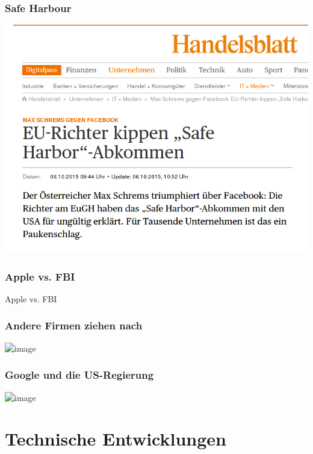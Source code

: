 \documentclass[12pt, xcolor={svgnames,table}]{beamer}
\begin{document}
\begin{frame}
  \frametitle{Safe Harbour}
  \begin{center}
    \includegraphics[height=0.7\textheight]{img/safeharbour.png}
  \end{center}
\end{frame}

\begin{frame}
  \frametitle{Apple vs. FBI}
    \Large Apple vs. FBI
\end{frame}

\begin{frame}
  \frametitle{Andere Firmen ziehen nach}
    \begin{center} 
      \includegraphics<1>[width=0.7\textwidth]{img/facebookgoogleencryption.png}
    \end{center}
\end{frame}

\begin{frame}
  \frametitle{Google und die US-Regierung}
    \begin{center} 
      \includegraphics<1>[width=0.7\textwidth]{img/google-assad.png}
    \end{center}
\end{frame}

\section{Technische Entwicklungen}
\subsection{}
\end{document}

